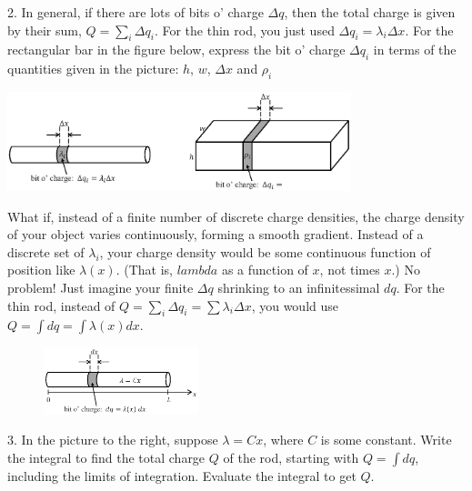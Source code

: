 2. In general, if there are lots of bits o' charge $\Delta q$, then the total charge is given by their sum, $Q = \sum_i \Delta q_i$. For the thin rod, you just used $\Delta q_i = \lambda_i \Delta x$.  For the rectangular bar in the figure below, express the bit o' charge $\Delta q_i$ in terms of the quantities given in the picture: $h$, $w$, $\Delta x$ and $\rho_i$

\vspace{-0.2 in}
\begin{center}
\includegraphics[width=0.75\textwidth]{charge_density/fig2.eps}
\end{center}
What if, instead of a finite number of discrete charge densities, the charge density of your object varies continuously, forming a smooth gradient. Instead of a discrete set of $\lambda_i$, your charge density would be some continuous function of position like $\lambda(x)$.  (That is, $lambda$ as a function of $x$, not times $x$.) No problem! Just imagine your finite $\Delta q$ shrinking to an infinitessimal $dq$.  For the thin rod, instead of $Q= \sum_i \Delta q_i = \sum \lambda_i \Delta x$, you would use $Q = \int dq = \int \lambda \left(x\right) dx$. 

\begin{figure}
\vspace{-0.4 in}
    \includegraphics[width=0.4\textwidth]{charge_density/fig3.eps}
\end{figure}
\vspace{0.2 in}
3. In the picture to the right, suppose $\lambda = Cx$, where $C$ is some constant. Write the integral to find the total charge $Q$ of the rod, starting with $Q = \int dq$, including the limits of integration.  Evaluate the integral to get $Q$.

